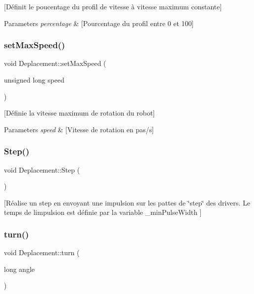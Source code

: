 [Définit le poucentage du profil de vitesse à vitesse maximum constante] 
\begin{DoxyParams}{Parameters}
{\em percentage} & [Pourcentage du profil entre 0 et 100] \\
\hline
\end{DoxyParams}
\label{class_deplacement_aef7913bd019404c430043d384611b422} 
\subsubsection{set\+Max\+Speed()}
{\footnotesize\ttfamily void Deplacement\+::set\+Max\+Speed (\begin{DoxyParamCaption}\item[{unsigned long}]{speed }\end{DoxyParamCaption})}

[Définie la vitesse maximum de rotation du robot] 
\begin{DoxyParams}{Parameters}
{\em speed} & [Vitesse de rotation en pas/s] \\
\hline
\end{DoxyParams}
\label{class_deplacement_a443ed9dd512b7b8353bc2e801b5bf371} 
\subsubsection{Step()}
{\footnotesize\ttfamily void Deplacement\+::\+Step (\begin{DoxyParamCaption}{ }\end{DoxyParamCaption})\hspace{0.3cm}{\ttfamily [protected]}}

[Réalise un step en envoyant une impulsion sur les pattes de \char`\"{}step\char`\"{} des drivers. Le temps de l\textquotesingle{}impulsion est définie par la variable \+\_\+min\+Pulse\+Width ] \label{class_deplacement_a0453b24fcf218a695f9aed36d2354623} 
\subsubsection{turn()}
{\footnotesize\ttfamily void Deplacement\+::turn (\begin{DoxyParamCaption}\item[{long}]{angle }\end{DoxyParamCaption})}

